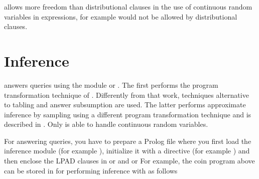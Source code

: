 \documentclass[letterpaper,10pt,english]{sphinxmanual}
\begin{document}
 allows more freedom than distributional clauses in the use of continuous random variables in expressions,
for example  would not be allowed by distributional clauses.


\chapter{Inference}
\label{\detokenize{index:inference}}
 answers queries using the module  or .
The first performs the program transformation technique of .
Differently from that work, techniques alternative to tabling and answer subsumption are used.
The latter performs approximate inference by sampling using a different program transformation technique and is described in .
Only  is able to handle continuous random variables.

For answering queries, you have to prepare a Prolog file where you first load the inference module (for example ), initialize it with a directive (for example ) and then enclose the LPAD clauses in  or  and  or 
For example, the coin program above can be stored in  for performing inference with  as follows
\end{document}
